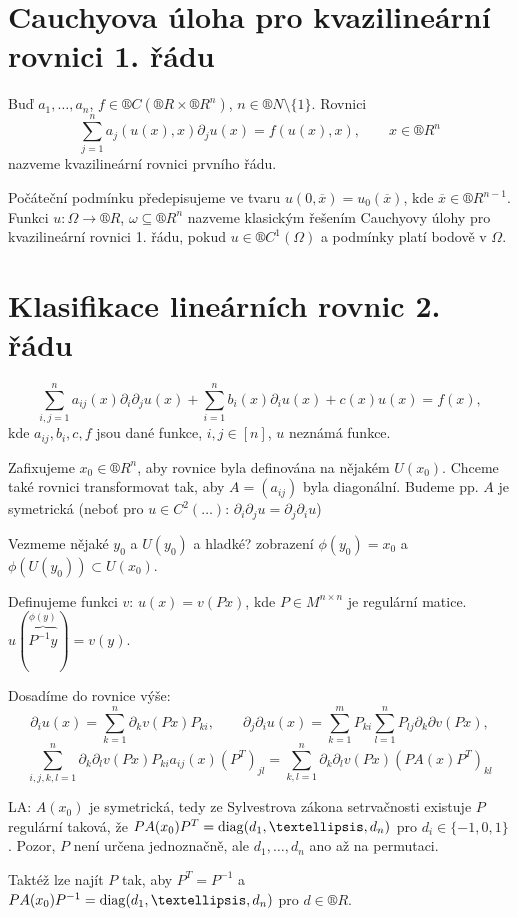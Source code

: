 \documentclass[12pt]{article}					%
\begin{document}
\section{Cauchyova úloha pro kvazilineární rovnici 1. řádu}
\begin{definice}
	Buď $a_1, …, a_n$, $f \in ®C(®R \times ®R^n)$, $n \in ®N \setminus \{1\}$. Rovnici
	$$ \sum_{j=1}^n a_j(u(x), x) \partial_j u(x) = f(u(x), x), \qquad x \in ®R^n $$
	nazveme kvazilineární rovnici prvního řádu.

	Počáteční podmínku předepisujeme ve tvaru $u(0, \overline{x}) = u_0(\overline{x})$, kde $\overline{x} \in ®R^{n-1}$. Funkci $u : \Omega \rightarrow ®R$, $\omega \subseteq ®R^n$ nazveme klasickým řešením Cauchyovy úlohy pro kvazilineární rovnici 1. řádu, pokud $u \in ®C^1(\Omega)$ a podmínky platí bodově v $\Omega$.
\end{definice}

\section{Klasifikace lineárních rovnic 2. řádu}
\begin{poznamka}
	$$ \sum_{i,j = 1}^n a_{ij}(x) \partial_i\partial_j u(x) + \sum_{i=1}^n b_i(x) \partial_i u(x) + c(x)u(x) = f(x), $$
	kde $a_{ij}, b_i, c, f$ jsou dané funkce, $i, j \in [n]$, $u$ neznámá funkce.

	Zafixujeme $x_0 \in ®R^n$, aby rovnice byla definována na nějakém $U(x_0)$. Chceme také rovnici transformovat tak, aby $A = (a_{ij})$ byla diagonální. Budeme pp. $A$ je symetrická (neboť pro $u \in C^2(…)$: $\partial_i\partial_j u = \partial_j\partial_i u$)
\end{poznamka}

\begin{definice}
	Vezmeme nějaké $y_0$ a $U(y_0)$ a hladké? zobrazení $\phi(y_0) = x_0$ a $\phi(U(y_0)) \subset U(x_0)$.

	Definujeme funkci $v$: $u(x) = v(P x)$, kde $P \in M^{n \times n}$ je regulární matice. $u(\overbrace{P^{-1}y}^{\phi(y)}) = v(y)$.

	Dosadíme do rovnice výše:
	$$ \partial_i u(x) = \sum_{k=1}^n \partial_k v (P x) P_{ki}, \qquad \partial_j\partial_i u(x) = \sum_{k=1}^m P_{ki} \sum_{l=1}^n P_{lj} \partial_k\partial v(P x), $$
	$$ \sum_{i,j,k,l=1}^n \partial_k\partial_l v(P x) P_{ki} a_{ij}(x) (P^T)_{jl} = \sum_{k, l = 1}^n \partial_k\partial_l v(P x) (PA(x)P^T)_{kl} $$

	LA: $A(x_0)$ je symetrická, tedy ze Sylvestrova zákona setrvačnosti existuje $P$ regulární taková, že $P A(x_0) P^T = \diag(d_1, …, d_n)$ pro $d_i \in \{-1, 0, 1\}$. Pozor, $P$ není určena jednoznačně, ale $d_1, …, d_n$ ano až na permutaci.

	Taktéž lze najít $P$ tak, aby $P^T = P^{-1}$ a $PA(x_0)P^{-1} = \diag(d_1, …, d_n)$ pro $d \in ®R$.
\end{definice}
\end{document}
